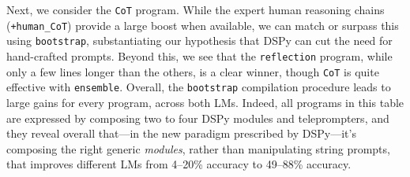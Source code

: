 Next, we consider the \texttt{CoT} program. While the expert human reasoning chains (\texttt{+human\_CoT}) provide a large boost when available, we can match or surpass this using \texttt{bootstrap}, substantiating our hypothesis that DSPy can cut the need for hand-crafted prompts. Beyond this, we see that the \texttt{reflection} program, while only a few lines longer than the others, is a clear winner, though \texttt{CoT} is quite effective with \texttt{ensemble}. Overall, the \texttt{bootstrap} compilation procedure leads to large gains for every program, across both LMs. Indeed, all programs in this table are expressed by composing two to four DSPy modules and teleprompters, and they reveal overall that---in the new paradigm prescribed by DSPy---it's composing the right generic \textit{modules}, rather than manipulating string prompts, that improves different LMs from 4--20\% accuracy to 49--88\% accuracy.

